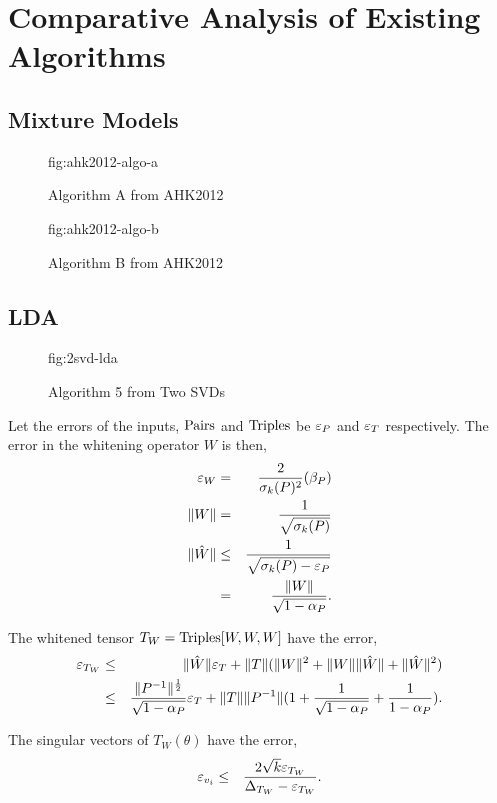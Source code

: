 \section{Comparative Analysis of Existing Algorithms}
\label{sec:comparative-analysis}

\subsection{Mixture Models}
\begin{figure}[htbp]
\floatconts
  {fig:ahk2012-algo-a}
  {\caption{Algorithm A from AHK2012}}
  {}
\end{figure}

\begin{figure}[htbp]
\floatconts
  {fig:ahk2012-algo-b}
  {\caption{Algorithm B from AHK2012}}
  {}
\end{figure}

\subsection{LDA}

\begin{figure}[htbp]
\floatconts
  {fig:2svd-lda}
  {\caption{Algorithm 5 from Two SVDs}}
  {}
\end{figure}

Let the errors of the inputs, $\mathrm{Pairs}$ and $\mathrm{Triples}$ be $\varepsilon_{P}$ and
$\varepsilon_{T}$ respectively. The error in the whitening operator $W$ is then,
\begin{eqnarray}
  \varepsilon_{W} &=& \frac{2}{\sigma_k(P)^2} (\beta_P) \\
  \|W\| &=& \frac{1}{\sqrt{\sigma_k(P)}} \\
  \|\hat{W}\| &\le& \frac{1}{\sqrt{\sigma_k(P) - \varepsilon_{P}}} \\
          &=& \frac{\|W\|}{\sqrt{1 - \alpha_P}}.
\end{eqnarray}

The whitened tensor $T_W = \mathrm{Triples}[W,W,W]$ have the error, 
\begin{eqnarray}
  \varepsilon_{T_W} 
    &\le& \|\hat{W}\| \varepsilon_{T} + \|T\| (\|W\|^2 + \|W\|\|\hat{W}\| + \|\hat{W}\|^2 ) \\
    &\le& \frac{\|P^{-1}\|^{\frac{1}{2}}}{\sqrt{1 - \alpha_P}} \varepsilon_{T} + \|T\| \|P^{-1}\| (1 + \frac{1}{\sqrt{1 - \alpha_P}} + \frac{1}{1 - \alpha_P}).
\end{eqnarray}

The singular vectors of $T_W(\theta)$ have the error,
\begin{eqnarray}
  \varepsilon_{v_i} 
    &\le& \frac{2 \sqrt{k} \varepsilon_{T_W}}{\Delta_{T_W} - \varepsilon_{T_W}}.
\end{eqnarray}

